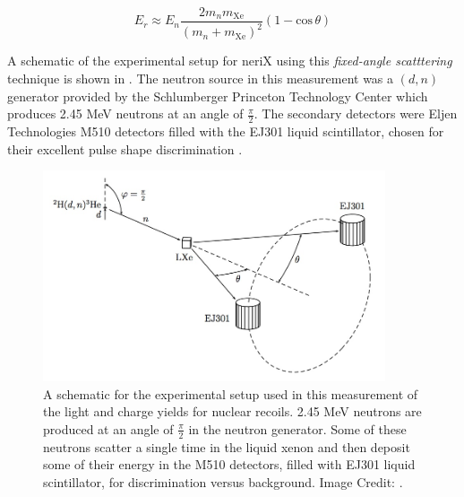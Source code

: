 \begin{equation}
        \label{eqn:nerix_energy_scattering_angle}
        E_r \approx E_n \frac{2 m_n m_{\textrm{Xe}}}{(m_n + m_{\textrm{Xe}})^2}(1 - \textrm{cos} \, \theta)
\end{equation}

A schematic of the experimental setup for neriX using this \textit{fixed-angle scatttering} technique is shown in .  The neutron source in this measurement was a $(d, n)$ generator provided by the Schlumberger Princeton Technology Center which produces 2.45 MeV neutrons at an angle of $\frac{\pi}{2}$.  The secondary detectors were Eljen Technologies M510 detectors filled with the EJ301 liquid scintillator, chosen for their excellent pulse shape discrimination \cite{ej301_manual}.  


\begin{figure}[t]
        \centering
	\includegraphics[width=0.9\textwidth]{nerix_expt_schematic}
	\caption{A schematic for the experimental setup used in this measurement of the light and charge yields for nuclear recoils.  2.45 MeV neutrons are produced at an angle of $\frac{\pi}{2}$ in the neutron generator.  Some of these neutrons scatter a single time in the liquid xenon and then deposit some of their energy in the M510 detectors, filled with EJ301 liquid scintillator, for discrimination versus background.  Image Credit: .}
	\label{fig:nerix_expt_schematic}
\end{figure}


